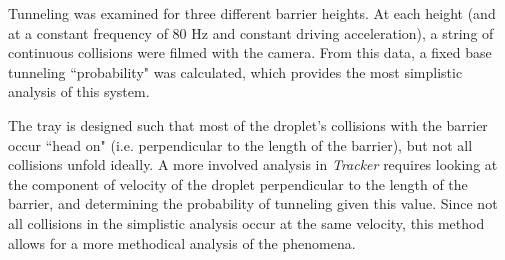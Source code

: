 Tunneling was examined for three different barrier heights. At each height (and at a constant frequency of 80 Hz and constant driving acceleration), a string of continuous collisions were filmed with the camera. From this data, a fixed base tunneling ``probability" was calculated, which provides the most simplistic analysis of this system. 

The tray is designed such that most of the droplet's collisions with the barrier occur ``head on" (i.e. perpendicular to the length of the barrier), but not all collisions unfold ideally. A more involved analysis in \textit{Tracker} requires looking at the component of velocity of the droplet perpendicular to the length of the barrier, and determining the probability of tunneling given this value. Since not all collisions in the simplistic analysis occur at the same velocity, this method allows for a more methodical analysis of the phenomena. 
